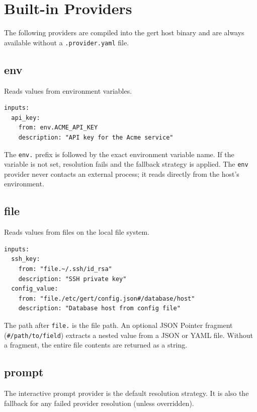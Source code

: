 \section{Built-in Providers}
\label{sec:builtin-providers}

The following providers are compiled into the gert host binary and are always
available without a \texttt{.provider.yaml} file.

\subsection{env}

Reads values from environment variables.

\begin{verbatim}
inputs:
  api_key:
    from: env.ACME_API_KEY
    description: "API key for the Acme service"
\end{verbatim}

The \texttt{env.} prefix is followed by the exact environment variable name.
If the variable is not set, resolution fails and the fallback strategy is
applied.  The \texttt{env} provider never contacts an external process; it
reads directly from the host's environment.

\subsection{file}

Reads values from files on the local file system.

\begin{verbatim}
inputs:
  ssh_key:
    from: "file.~/.ssh/id_rsa"
    description: "SSH private key"
  config_value:
    from: "file./etc/gert/config.json#/database/host"
    description: "Database host from config file"
\end{verbatim}

The path after \texttt{file.} is the file path.  An optional JSON Pointer
fragment (\texttt{\#/path/to/field}) extracts a nested value from a JSON or
YAML file.  Without a fragment, the entire file contents are returned as a
string.

\subsection{prompt}

The interactive prompt provider is the default resolution strategy.  It is
also the fallback for any failed provider resolution (unless overridden).

